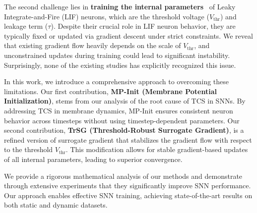 The second challenge lies in \textbf{training the internal parameters}~\cite{fang:2021, wang:2022, rathi:2023} of Leaky Integrate-and-Fire (LIF) neurons, which are the threshold voltage ($V_{\text{thr}}$) and leakage term ($\tau$). Despite their crucial role in LIF neuron behavior, they are typically fixed or updated via gradient descent under strict constraints. We reveal that existing gradient flow heavily depends on the scale of $V_{\text{thr}}$, and unconstrained updates during training could lead to significant instability. Surprisingly, none of the existing studies has explicitly recognized this issue.

In this work, we introduce a comprehensive approach to overcoming these limitations. Our first contribution, \textbf{MP-Init (Membrane Potential Initialization)}, stems from our analysis of the root cause of TCS in SNNs. By addressing TCS in membrane dynamics, MP-Init ensures consistent neuron behavior across timesteps without using timestep-dependent parameters. Our second contribution, \textbf{TrSG (Threshold-Robust Surrogate Gradient)}, is a refined version of surrogate gradient that stabilizes the gradient flow with respect to the threshold $V_{\text{thr}}$. This modification allows for stable gradient-based updates of all internal parameters, leading to superior convergence.

We provide a rigorous mathematical analysis of our methods and demonstrate through extensive experiments that they significantly improve SNN performance. Our approach enables effective SNN training, achieving state-of-the-art results on both static and dynamic datasets.